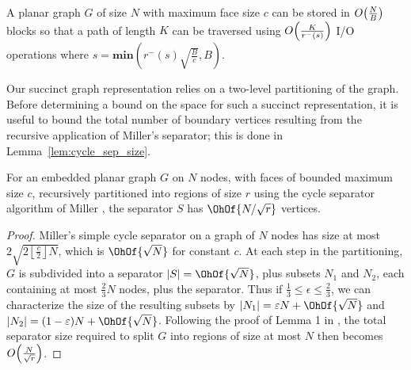 {\begin{lemma}
  A planar graph $G$ of size $N$ with maximum face size $c$ 
  can be stored in
  $O\!\left( \frac{N}{B} \right)$ blocks so that a path of length $K$ can
  be traversed using $O\!\left( \frac{K}{ r^{-}(s) } \right)$ I/O operations
  where $s = \textbf{min}\left( r^{-}(s)\sqrt{\frac{B}{c}}, B \right)$.
\end{lemma}

Our succinct graph representation relies on a two-level partitioning of 
the graph.
Before determining a bound on the space for such a succinct representation,
it is useful to bound the total number of boundary vertices 
resulting from the recursive application of Miller's separator; this is 
done in Lemma~\ref{lem:cycle_sep_size}.

\begin{lemma}
  \label{lem:cycle_sep_size}
  For an embedded planar graph $G$ on $N$ nodes, with faces of
  bounded maximum size $c$, recursively partitioned into regions of
  size $r$ using the cycle separator algorithm of Miller
  \cite{miller_1986}, the separator $S$ has $\OhOf{N/\sqrt{r}}$
  vertices.
\end{lemma}

\begin{proof}
  Miller's simple cycle separator on a graph of $N$ nodes has size at
  most $2 \sqrt{ 2 \left\lfloor \frac{c}{2} \right\rfloor N}$, which
  is $\OhOf{\sqrt{N}}$ for constant $c$. At each step in the
  partitioning, $G$ is subdivided into a separator $|S| =
  \OhOf{\sqrt{N}}$, plus subsets $N_1$ and $N_2$, each containing at
  most $\frac{2}{3}N$ nodes, plus the separator. 
  Thus if $\frac{1}{3} \le \epsilon \le \frac{2}{3}$, 
  we can characterize the size of the
  resulting subsets by $|N_1| = \epsilon N + \OhOf{\sqrt{N}}$ and
  $|N_2| = (1-\epsilon)N + \OhOf{\sqrt{N}}$. Following the proof of
  Lemma 1 in \cite{Frederickson87}, the total separator size required to
  split $G$ into regions of size at most $N$ then becomes
  $O\!\left(\frac{N}{\sqrt{r}}\right)$.
\end{proof}

}
